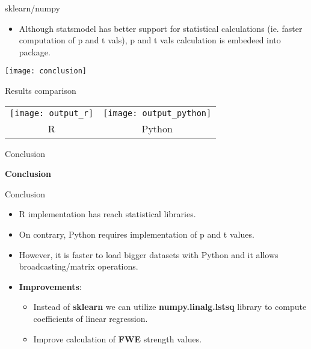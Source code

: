 \documentclass[english,aspectratio=169]{beamer}
\begin{document}
\begin{frame}{sklearn/numpy}
    \begin{itemize}
        \item Although statsmodel has better support for statistical calculations (ie. faster computation of p and t vals), p and t vals calculation is embedeed into package.
    \end{itemize}

    \begin{center}
        \texttt{[image: conclusion]}
    \end{center}
\end{frame}

\begin{frame}{Results comparison}%

\begin{tabular}{cc}
    \texttt{[image: output\_r]}
  &
    \texttt{[image: output\_python]}
   \\
   R & Python
 \end{tabular}

\end{frame}


\begin{frame}{Conclusion}%

  \begin{center}
        \textbf{\Large Conclusion}
  \end{center}

\end{frame}

\begin{frame}{Conclusion}%

  \begin{itemize}
      \item R implementation has reach statistical libraries.
      \item On contrary, Python requires implementation of p and t values.
      \item However, it is faster to load bigger datasets with Python and it allows broadcasting/matrix operations.
      \item \textbf{Improvements}:
      \begin{itemize}
          \item Instead of \textbf{sklearn} we can utilize \textbf{numpy.linalg.lstsq} library to compute coefficients of linear regression.
          \item Improve calculation of \textbf{FWE} strength values.
      \end{itemize}
  \end{itemize}

\end{frame}
\end{document}
